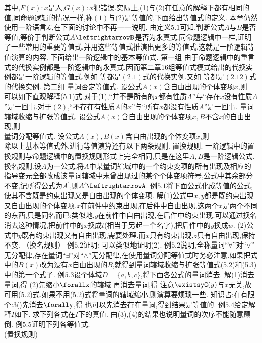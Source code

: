 {其中,$F(x):x$是人,$G(x):x$犯错误.实际上,(1)与(2)在任意的解释下都有相同的值,同命题逻辑的情况一样,称$(1)$与(2)是等值的,下面给出等值式的定义.
本章仍然使用一阶语言$\mathscr{L}$,在下面的讨论中不再一一说明.
由定义$5.1$可知,判断公式$A$与$B$是否等值,等价于判断公式$A\leftrightarrowB$是否为永真式.同命题逻辑中一样,证明了一些常用的重要等值式,并用这些等值式推演出更多的等值式,这就是一阶逻辑等值演算的内容.
下面给出一阶逻辑中的基本等值式.
{第一组}
由于命题逻辑中的重言式的代换实例都是一阶逻辑中的永真式,因而第二章16组等值式模式给出的代换实例都是一阶逻辑的等值式.例如
等都是$(2.1)$式的代换实例.又如
等都是$(2.12)$式的代换实例.
{第二组}
量词否定等值式.
设公式$A(x)$含自由出现的个体变项$x$,则\\
可以如下直观解释(5.1)式.对于(1),“并不是所有的$x$都有性质$A$”与“存在$x$没有性质$A$”是一回事.对于$(2)$,“不存在有性质$A$的$x$”与“所有$x$都没有性质$A$”是一回事.
量词辖域收缩与扩张等值式.
设公式$A(x)$含自由出现的个体变项$x,B$不含$x$的自由出现,则\\
量词分配等值式.
设公式$A(x),B(x)$含自由出现的个体变项$x$,则\\
除以上基本等值式外,进行等值演算还有以下两条规则.
置换规则.
一阶逻辑中的置换规则与命题逻辑中的置换规则形式上完全相同,只是在这里$A,B$是一阶逻辑公式.
换名规则.设$A$为一公式,将$A$中某量词辖域中的一个约束变项的所有出现及相应的指导变元全部改成该量词辖域中末曾出现过的某个个体变项符号,公式中其余部分不变,记所得公式为$A^{\prime}$,则$A^{\prime}\LeftrightarrowA$.
例$5.1$将下面公式化成等值的公式,使其不含既是约束出现又是自由出现的个体变项.
解(1)公式中$x,y$都是既约束出现又自由出现的个体变项.$x$在前件中约束出现,在后件中自由出现,这两个$x$是两个不同的东西,只是同名而已;类似地,$y$在前件中自由出现,在后件中约束出现.可以通过换名消去这种情况,把前件中的$x$换成$t$(相当于另起一个名字),把后件中的$y$换成$w$.
(2)公式中$y$既有约束出现又有自由出现,需要处理.而$x$只有约束出现,$z$只有自由出现,保持不变.
（换名规则）
例$5.2$证明:
可以类似地证明(2).
例$5.2$说明,全称量词“$\forall$”对“$\vee”$无分配律,存在量词“$\exists”$对“$\wedge$”无分配律,在使用量词分配等值式时务必注意.如果把式中的$B(x)$改为没有$x$自由出现的$B$,就得到量词辖域收缩与扩张等值式(5.2)和(5.3)中的第一个式子.
例$5.3$设个体域$D=\{a,b,c\}$,将下面各公式的量词消去.
解(1)消去量词,得
(2)先缩小$\forallx$的辖域
再消去量词,得
注意$\existsyG(y)$与$x$无关,故可用(5.2)式.如果不用(5.2)式将量词的辖域缩小,则演算要烦琐一些.
知识占:在有限个:3()先消去$\forally$,得
也可以先消去存在量词,得到结果是等值的.
例$5.4$给定解释$I$如下.
求下列各式在$I$下的真值.
由(3),(4)的结果也说明量词的次序不能随意颠倒.
例$5.5$证明下列各等值式.\\
(置换规则)
}
